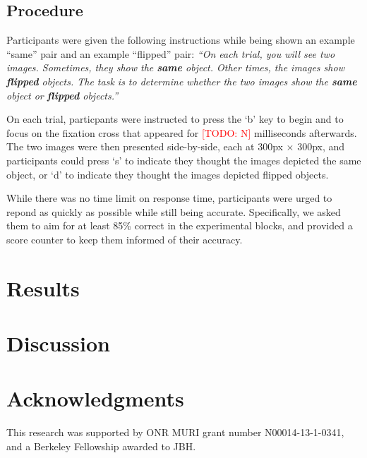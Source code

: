 \documentclass[10pt,letterpaper]{article}
\newcommand{\TODO}[1]{\textcolor{red}{[TODO: #1]}}
\begin{document}
\subsection{Procedure}

Participants were given the following instructions while being shown
an example ``same'' pair and an example ``flipped'' pair: \textit{``On
  each trial, you will see two images. Sometimes, they show the
  \textbf{same} object. Other times, the images show \textbf{flipped}
  objects. The task is to determine whether the two images show the
  \textbf{same} object or \textbf{flipped} objects.''}

On each trial, particpants were instructed to press the `b' key to
begin and to focus on the fixation cross that appeared for \TODO{N}
milliseconds afterwards. The two images were then presented
side-by-side, each at 300px $\times$ 300px, and participants could
press `s' to indicate they thought the images depicted the same
object, or `d' to indicate they thought the images depicted flipped
objects.

While there was no time limit on response time, participants were
urged to repond as quickly as possible while still being
accurate. Specifically, we asked them to aim for at least 85\% correct
in the experimental blocks, and provided a score counter to keep them
informed of their accuracy.


\section{Results}


\section{Discussion}


\section{Acknowledgments}

This research was supported by ONR MURI grant number N00014-13-1-0341,
and a Berkeley Fellowship awarded to JBH.



\setlength{\bibleftmargin}{.125in}
\setlength{\bibindent}{-\bibleftmargin}


\end{document}
